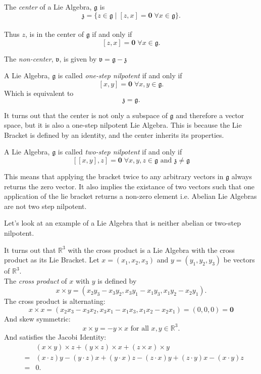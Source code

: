 \documentclass[11 pt]{article}
\newcommand{\br}[2]{\left[#1,#2\right]}
\newcommand{\R}{\mathbb{R}}
\newcommand{\fg}{\mathfrak{g}}
\newcommand{\fz}{\mathfrak{z}}
\newcommand{\fv}{\mathfrak{v}}
\newcommand{\zvec}{\mathbf{0}}
\newcommand{\RR}{\mathbb{R}}
\begin{document}
\begin{definition}
    The \emph{center} of a Lie Algebra, $\fg$ is
    \\\[\fz=\{z \in \fg \mid [z,x]
    = \zvec \; \forall x \in \fg\}.\]
    \\Thus $z$, is in the center of $\fg$ if and only if
    \\\[[z,x] = \zvec \; \forall x \in \fg.\]

    The \emph{non-center}, $\fv$, is given by $\fv = \fg - \fz$
\end{definition}

\begin{definition}
    A Lie Algebra, $\fg$ is called \emph{one-step nilpotent} if and only if
    \[\br{x}{y} = \zvec \; \forall x,y \in \fg. \]
    Which is equivalent to \[\fz = \fg.\]
\end{definition}

It turns out that the center is not only a subspace of $\fg$ and therefore a
vector space, but it is also a one-step nilpotent Lie Algebra.  This is
because the Lie Bracket is defined by an identity, and the center inherits its
properties.

\begin{definition}
    A Lie Algebra, $\fg$ is called \emph{two-step nilpotent} if and only if
    \[
        [[x,y],z] = \zvec \; \forall x,y,z \in \fg
        \text{ and } \fz \neq \fg
    \]
\end{definition}
This means that applying the bracket twice to any arbitrary vectors in $\fg$
always returns the zero vector.  It also implies the existance of two vectors
such that one application of the lie bracket returns a non-zero element i.e.
Abelian Lie Algebras are not two step nilpotent.

Let's look at an example of a Lie Algebra that is neither abelian or two-step
nilpotent.

\begin{example}
    It turns out that $\RR^3$ with the cross product is a Lie Algebra with the
    cross product as its Lie Bracket.
    Let $x = (x_1, x_2, x_3)$ and $y = (y_1, y_2, y_3)$ be vectors of $\RR^3$.
    \\The \emph{cross product} of $x$ with $y$ is defined by
    $$
    x \times y = (x_2y_3 - x_3y_2, x_3y_1 - x_1y_3, x_1y_2 - x_2y_1).
    $$
    The cross product is alternating:
    $$
    x \times x = (x_2x_3 - x_3x_2, x_3x_1 - x_1x_3, x_1x_2 - x_2x_1)
    = (0, 0, 0)
    = \zvec
    $$
    And skew symmetric:
    $$
    x \times y = - y \times x \text{\ \ for\ all\ } x,y \in \R^3.
    $$
    And satisfies the Jacobi Identity:
    \begin{eqnarray*}
    & & (x \times y) \times z + (y \times z) \times x + (z \times x) \times y
    \\ & = &
    (x \cdot z)y - (y \cdot z)x + (y\cdot x)z - (z \cdot x)y +
    (z \cdot y)x - (x \cdot y)z
    \\ & = & 0.
    \end{eqnarray*}
\end{example}
\end{document}
